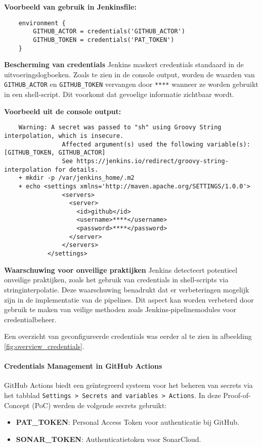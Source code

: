 \textbf{Voorbeeld van gebruik in Jenkinsfile:}
\begin{verbatim}
    environment {
        GITHUB_ACTOR = credentials('GITHUB_ACTOR')
        GITHUB_TOKEN = credentials('PAT_TOKEN')
    }
\end{verbatim}

\textbf{Bescherming van credentials}  
Jenkins maskert credentials standaard in de uitvoeringslogboeken. Zoals te zien in de console output, worden de waarden van \texttt{GITHUB\_ACTOR} en \texttt{GITHUB\_TOKEN} vervangen door \texttt{****} wanneer ze worden gebruikt in een shell-script. Dit voorkomt dat gevoelige informatie zichtbaar wordt.

\textbf{Voorbeeld uit de console output:}
\begin{verbatim}
    Warning: A secret was passed to "sh" using Groovy String interpolation, which is insecure.
                Affected argument(s) used the following variable(s): [GITHUB_TOKEN, GITHUB_ACTOR]
                See https://jenkins.io/redirect/groovy-string-interpolation for details.
    + mkdir -p /var/jenkins_home/.m2
    + echo <settings xmlns='http://maven.apache.org/SETTINGS/1.0.0'>
                <servers>
                  <server>
                    <id>github</id>
                    <username>****</username>
                    <password>****</password>
                  </server>
                </servers>
            </settings>
\end{verbatim}

\textbf{Waarschuwing voor onveilige praktijken}  
Jenkins detecteert potentieel onveilige praktijken, zoals het gebruik van credentials in shell-scripts via stringinterpolatie. Deze waarschuwing benadrukt dat er verbeteringen mogelijk zijn in de implementatie van de pipelines. Dit aspect kan worden verbeterd door gebruik te maken van veilige methoden zoals Jenkins-pipelinemodules voor credentialbeheer.

Een overzicht van geconfigureerde credentials was eerder al te zien in afbeelding \ref{fig:overview_credentials}.


\paragraph{Credentials Management in GitHub Actions}

GitHub Actions biedt een geïntegreerd systeem voor het beheren van secrets via het tabblad \texttt{Settings > Secrets and variables > Actions}. In deze Proof-of-Concept (PoC) werden de volgende secrets gebruikt:
\begin{itemize}
    \item \textbf{PAT\_TOKEN}: Personal Access Token voor authenticatie bij GitHub.
    \item \textbf{SONAR\_TOKEN}: Authenticatietoken voor SonarCloud.
\end{itemize}

